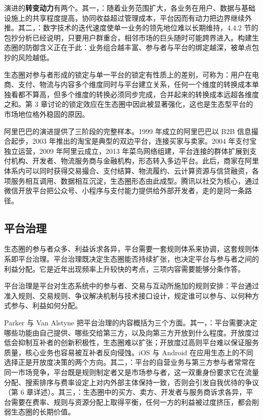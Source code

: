 演进的\textbf{转变动力}有两个。其一，：随着业务范围扩大，各业务在用户、数据与基础设施上的共享程度提高，协同收益超过管理成本，平台因而有动力把边界继续外推。其二，：数字技术的迭代速度使单一业务的领先地位难以长期维持，4.4.2 节的包抄分析已经说明，只要用户群重合，相邻市场的巨头随时可能跨界进入。构建生态圈的防御含义正在于此：业务组合越丰富、参与者与平台的绑定越深，被单点包抄的风险越低。

生态圈对参与者形成的锁定与单一平台的锁定有性质上的差别，可称为：用户在电商、支付、物流与内容多个维度同时与平台建立关系，任何一个维度的转换成本单独看都不算高，但多个维度的转换必须同步完成，合并起来的转换成本远超各维度之和。第 3 章讨论的锁定效应在生态圈中因此被显著强化，这也是生态型平台的市场地位格外稳固的原因。

阿里巴巴的演进提供了三阶段的完整样本。1999 年成立的阿里巴巴以 B2B 信息撮合起步，2003 年推出的淘宝是典型的双边平台，连接买家与卖家。2004 年支付宝独立运营，2009 年阿里云成立，2013 年菜鸟网络组建，平台连接的群体扩展到支付机构、开发者、物流服务商与金融机构，形态转入多边平台。此后，商家在阿里体系内可以同时获得交易撮合、支付结算、物流履约、云计算资源与信贷融资，各项服务相互调用、数据相互沉淀，生态圈形态由此成型。腾讯以社交为核心，通过微信开放平台把公众号、小程序与支付能力提供给外部开发者，走的是同一条路径。

\subsection{平台治理}

生态圈的参与者众多、利益诉求各异，平台需要一套规则体系来协调，这套规则体系即平台治理。平台治理既决定生态圈能否持续扩张，也决定平台与参与者之间的利益分配。它是近年出现频率上升较快的考点，三项内容需要能够分条作答。

\begin{definition}
平台治理是平台对生态系统中的参与者、交易与互动所施加的规则安排：平台通过准入规则、交易规则、争议解决机制与技术接口设计，规定谁可以参与、以何种方式参与、利益如何分配。
\end{definition}

Parker 与 Van Alstyne 把平台治理的内容概括为三个方面。其一，：平台需要决定哪些功能由自己提供、哪些交给第三方，以及向第三方开放到什么程度。开放度过低会抑制互补者的创新积极性，生态圈难以扩张；开放度过高则平台难以保证服务质量，核心业务也容易被互补者反向侵蚀。iOS 与 Android 在应用生态上的不同选择正是开放度决策的两个方向。其二，：平台的自营业务与第三方参与者常常在同一市场竞争，平台既是规则制定者又是市场参与者，这一双重身份要求它在流量分配、搜索排序与费率设定上对内外部主体保持一致，否则会引发自我优待的争议（第 6 章详述）。其三，：生态圈中的买方、卖方、开发者与服务商诉求各异，平台需要在费率、规则与资源分配上取得平衡，任何一方的利益被过度挤压，都会削弱生态圈的长期价值。

